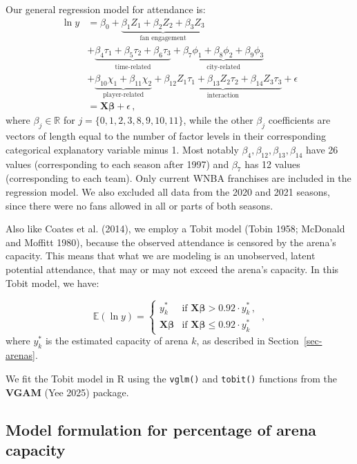 \documentclass[
  letterpaper,
  DIV=11,
  numbers=noendperiod]{scrartcl}
\begin{document}
Our general regression model for attendance is: \begin{align*}
  \ln{y} &= \beta_0 + \underbrace{\beta_1 Z_1 + \beta_2 Z_2 + \beta_3 Z_3}_{\text{fan engagement}} \\
    &+ \underbrace{\beta_4 \tau_1 + \beta_5 \tau_2 + \beta_6 \tau_3}_{\text{time-related}} + \underbrace{\beta_7 \phi_1 + \beta_8 \phi_2 + \beta_9 \phi_3}_{\text{ city-related }} \\
    &+ \underbrace{\beta_{10} \chi_1 + \beta_{11} \chi_2}_{\text{player-related}} + \underbrace{\beta_{12} Z_1 \tau_1 + \beta_{13} Z_2 \tau_2 + \beta_{14} Z_3 \tau_3}_{\text{interaction}} + \epsilon \\
    &= \symbf{X} \symbf{\beta} + \epsilon \,,
\end{align*} where \(\beta_j \in \mathbb{R}\) for
\(j = \{0, 1, 2, 3, 8, 9, 10, 11\}\), while the other \(\beta_j\)
coefficients are vectors of length equal to the number of factor levels
in their corresponding categorical explanatory variable minus 1. Most
notably \(\beta_4, \beta_{12}, \beta_{13}, \beta_{14}\) have 26 values
(corresponding to each season after 1997) and \(\beta_7\) has 12 values
(corresponding to each team). Only current WNBA franchises are included
in the regression model. We also excluded all data from the 2020 and
2021 seasons, since there were no fans allowed in all or parts of both
seasons.

Also like Coates et al. (2014), we employ a Tobit model (Tobin 1958;
McDonald and Moffitt 1980), because the observed attendance is censored
by the arena's capacity. This means that what we are modeling is an
unobserved, latent potential attendance, that may or may not exceed the
arena's capacity. In this Tobit model, we have:

\[
  \mathbb{E}(\ln{y}) = \begin{cases} y^*_k & \text{if } \symbf{X} \symbf{\beta} > 0.92 \cdot y^*_k \,, \\
                         \symbf{X} \symbf{\beta} & \text{if } \symbf{X} \symbf{\beta} \leq 0.92 \cdot y^*_k
                         \end{cases} \,,
\] where \(y^*_k\) is the estimated capacity of arena \(k\), as
described in Section~\ref{sec-arenas}.

We fit the Tobit model in R using the \texttt{vglm()} and
\texttt{tobit()} functions from the \textbf{VGAM} (Yee 2025) package.

\subsection{Model formulation for percentage of arena
capacity}\label{sec-mod-cap}
\end{document}
